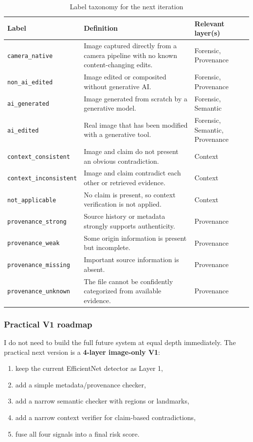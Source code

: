 \documentclass[11pt]{article}
\begin{document}
\begin{table}[H]
\centering
\caption{Label taxonomy for the next iteration}
\label{tab:label-taxonomy}
\begin{tabular}{p{3.2cm}p{5.5cm}p{5.2cm}}
\toprule
Label & Definition & Relevant layer(s) \\
\midrule
\texttt{camera\_native} & Image captured directly from a camera pipeline with no known content-changing edits. & Forensic, Provenance \\
\texttt{non\_ai\_edited} & Image edited or composited without generative AI. & Forensic, Provenance \\
\texttt{ai\_generated} & Image generated from scratch by a generative model. & Forensic, Semantic \\
\texttt{ai\_edited} & Real image that has been modified with a generative tool. & Forensic, Semantic, Provenance \\
\texttt{context\_consistent} & Image and claim do not present an obvious contradiction. & Context \\
\texttt{context\_inconsistent} & Image and claim contradict each other or retrieved evidence. & Context \\
\texttt{not\_applicable} & No claim is present, so context verification is not applied. & Context \\
\texttt{provenance\_strong} & Source history or metadata strongly supports authenticity. & Provenance \\
\texttt{provenance\_weak} & Some origin information is present but incomplete. & Provenance \\
\texttt{provenance\_missing} & Important source information is absent. & Provenance \\
\texttt{provenance\_unknown} & The file cannot be confidently categorized from available evidence. & Provenance \\
\bottomrule
\end{tabular}
\end{table}

\subsubsection{Practical V1 roadmap}
I do not need to build the full future system at equal depth immediately. The practical next version is a \textbf{4-layer image-only V1}:
\begin{enumerate}[leftmargin=1.5em]
    \item keep the current EfficientNet detector as Layer 1,
    \item add a simple metadata/provenance checker,
    \item add a narrow semantic checker with regions or landmarks,
    \item add a narrow context verifier for claim-based contradictions,
    \item fuse all four signals into a final risk score.
\end{enumerate}
\end{document}
